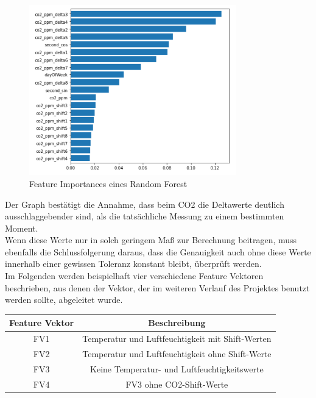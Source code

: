 \begin{figure}[h]
    \centering
    \includegraphics[width=0.8\textwidth]{pic/feature_importances_better.png}
    \caption{Feature Importances eines Random Forest}
    \label{fig:FIB}
\end{figure}

Der Graph bestätigt die Annahme, dass beim CO2 die Deltawerte deutlich ausschlaggebender sind, als die 
tatsächliche Messung zu einem bestimmten Moment. \\

Wenn diese Werte nur in solch geringem Maß zur Berechnung beitragen, muss ebenfalls die Schlussfolgerung daraus, 
dass die Genauigkeit auch ohne diese Werte innerhalb einer gewissen Toleranz konstant bleibt, überprüft werden.
\\
Im Folgenden werden beispielhaft vier verschiedene Feature Vektoren beschrieben, aus denen der Vektor, der im 
weiteren Verlauf des Projektes benutzt werden sollte, abgeleitet wurde.
\begin{center}
    \begin{tabular}{ |c||c| } 
     \hline
     Feature Vektor & Beschreibung \\ 
     \hline\hline
     FV1 & Temperatur und Luftfeuchtigkeit mit Shift-Werten\\ 
     FV2 & Temperatur und Luftfeuchtigkeit ohne Shift-Werte \\ 
     FV3 & Keine Temperatur- und Luftfeuchtigkeitswerte \\ 
     FV4 & FV3 ohne CO2-Shift-Werte \\
     \hline
    \end{tabular}
\end{center}

